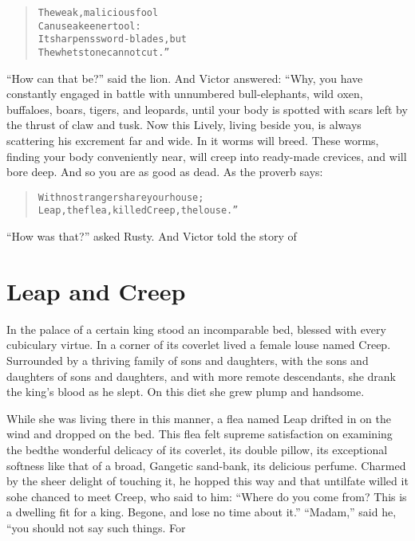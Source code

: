 \documentclass[article, twoside, 14pt]{memoir}
\renewenvironment{verbatim}{%
\begin{quote}%
\vskip -10pt%
\begin{alltt}\normalfont\large}{\end{alltt}%
\end{quote}%
\vskip -10pt
} %
\begin{document}
\begin{verbatim}
The weak, malicious fool
Can use a keener tool:
It sharpens sword-blades, but
The whetstone cannot cut.”
\end{verbatim}
``How can that be?'' said the lion. And Victor answered:
“Why, you have constantly engaged in battle with unnumbered
bull-elephants, wild oxen, buffaloes, boars, tigers, and leopards,
until your body is spotted with scars left by the thrust of claw
and tusk. Now this Lively, living beside you, is always scattering
his excrement far and wide. In it worms will breed. These worms,
finding your body conveniently near, will creep into ready-made
crevices, and will bore deep. And so you are as good as dead. As
the proverb says:

\begin{verbatim}
With no stranger share your house;
Leap, the flea, killed Creep, the louse.”
\end{verbatim}
``How was that?'' asked Rusty. And Victor told the story of

\chapter{Leap and Creep}

\label{s13}

In the palace of a certain king stood an incomparable bed, blessed
with every cubiculary virtue. In a corner of its coverlet lived a
female louse named Creep. Surrounded by a thriving family of sons
and daughters, with the sons and daughters of sons and daughters,
and with more remote descendants, she drank the king's blood as he
slept. On this diet she grew plump and handsome.

While she was living there in this manner, a flea named Leap
drifted in on the wind and dropped on the bed. This flea felt
supreme satisfaction on examining the bed{\textemdash}the wonderful delicacy
of its coverlet, its double pillow, its exceptional softness like
that of a broad, Gangetic sand-bank, its delicious perfume. Charmed
by the sheer delight of touching it, he hopped this way and that
until{\textemdash}fate willed it so{\textemdash}he chanced to meet Creep, who said to
him:
``Where do you come from? This is a dwelling fit for a king. Begone, and lose no time about it.''
``Madam,'' said he, “you should not say such things. For
\end{document}
